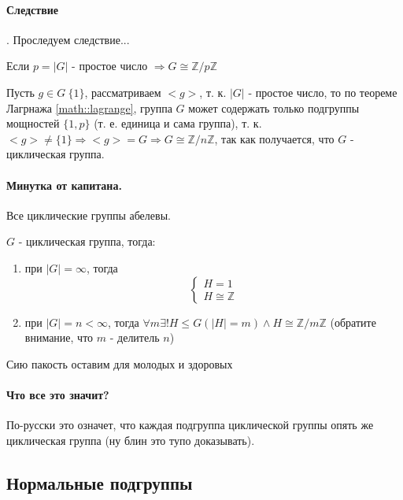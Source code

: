 \paragraph{Следствие}. Проследуем следствие...

Если $p = \left|G\right|$ - простое число $\Rightarrow G \cong \mathbb{Z}/{p\mathbb{Z}}$

\begin{Proof}
Пусть $g \in G \ \{1\}$, рассматриваем $<g>$, т. к. $\left|G\right|$ - простое число, то по теореме Лагрнажа \ref{math::lagrange}, группа $G$ может содержать только подгруппы мощностей $\{1, p\}$ (т. е. единица и сама группа), т. к. $<g> \not= \{1\} \Rightarrow <g> = G \Rightarrow G \cong \mathbb{Z}/{n\mathbb{Z}}$, так как получается, что $G$ - циклическая группа.
\end{Proof}

\paragraph{Минутка от капитана.} Все циклические группы абелевы.

\begin{Th}
$G$ - циклическая группа, тогда:
\begin{enumerate}
\item при $\left|G\right| = \infty$, тогда
\[
\begin{cases}
	H = {1} \\
	H \cong \mathbb{Z}
\end{cases}
\]

\item при $\left|G\right| = n < \infty$, тогда $\forall m \exists ! H \le G \left( \left|H\right|=m\right) \land H \cong \mathbb{Z}/{m\mathbb{Z}}$ (обратите внимание, что $m$ - делитель $n$)
\end{enumerate}
\end{Th}

\begin{Proof}
Сию пакость оставим для молодых и здоровых
\end{Proof}

\paragraph{Что все это значит?} По-русски это означет, что каждая подгруппа циклической группы опять же циклическая группа (ну блин это тупо доказывать).

\subsection{Нормальные подгруппы}

